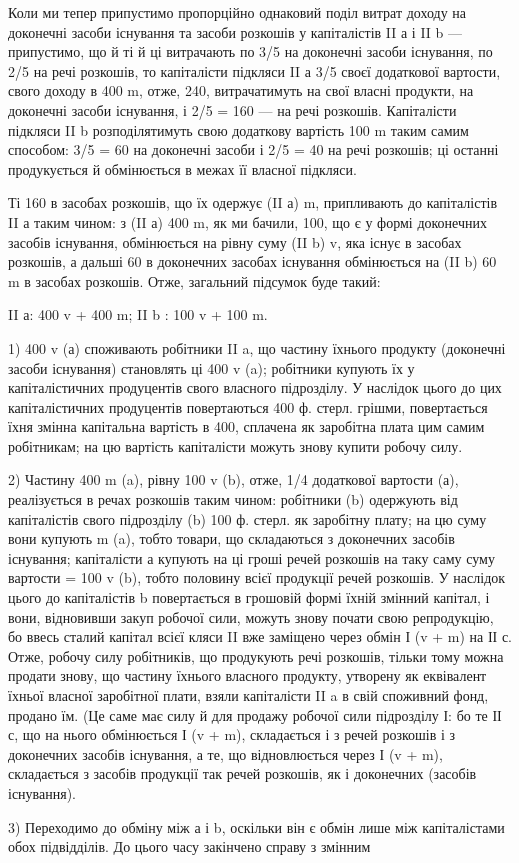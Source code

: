 Коли ми тепер припустимо пропорційно однаковий поділ витрат
доходу на доконечні засоби існування та засоби розкошів у капіталістів
II а і II b — припустимо, що й ті й ці витрачають по 3/5 на доконечні
засоби існування, по 2/5 на речі розкошів, то капіталісти підкляси II а
3/5 своєї додаткової вартости, свого доходу в 400 m, отже, 240, витрачатимуть
на свої власні продукти, на доконечні засоби існування, і
2/5 = 160 — на речі розкошів. Капіталісти підкляси II b розподілятимуть
свою додаткову вартість 100 m таким самим способом: 3/5 = 60 на доконечні
засоби і 2/5 = 40 на речі розкошів; ці останні продукується й
обмінюється в межах її власної підкляси.

Ті 160 в засобах розкошів, що їх одержує (II а) m, припливають до
капіталістів II а таким чином: з (II а) 400 m, як ми бачили, 100, що є у
формі доконечних засобів існування, обмінюється на рівну суму (II b) v,
яка існує в засобах розкошів, а дальші 60 в доконечних засобах існування
обмінюється на (II b) 60 m в засобах розкошів. Отже, загальний
підсумок буде такий:

II а: 400 v + 400 m; II b : 100 v + 100 m.

1) 400 v (а) споживають робітники II a, що частину їхнього продукту
(доконечні засоби існування) становлять ці 400 v (a); робітники купують
їх у капіталістичних продуцентів свого власного підрозділу. У наслідок
цього до цих капіталістичних продуцентів повертаються 400 ф. стерл.
грішми, повертається їхня змінна капітальна вартість в 400, сплачена як
заробітна плата цим самим робітникам; на цю вартість капіталісти можуть
знову купити робочу силу.

2) Частину 400 m (a), рівну 100 v (b), отже, 1/4 додаткової вартости (а),
реалізується в речах розкошів таким чином: робітники (b) одержують від
капіталістів свого підрозділу (b) 100 ф. стерл. як заробітну плату; на
цю суму вони купують m (a), тобто товари, що складаються з доконечних
засобів існування; капіталісти а купують на ці гроші речей
розкошів на таку саму суму вартости = 100 v (b), тобто половину всієї
продукції речей розкошів. У наслідок цього до капіталістів b повертається
в грошовій формі їхній змінний капітал, і вони, відновивши закуп
робочої сили, можуть знову почати свою репродукцію, бо ввесь сталий
капітал всієї кляси II вже заміщено через обмін І (v + m) на ІІ с. Отже,
робочу силу робітників, що продукують речі розкошів, тільки тому
можна продати знову, що частину їхнього власного продукту, утворену
як еквівалент їхньої власної заробітної плати, взяли капіталісти II a в
свій споживний фонд, продано їм. (Це саме має силу й для продажу робочої
сили підрозділу І: бо те ІІ с, що на нього обмінюється І (v + m), складається
і з речей розкошів і з доконечних засобів існування, а те, що
відновлюється через І (v + m), складається з засобів продукції так речей
розкошів, як і доконечних (засобів існування).

3) Переходимо до обміну між а і b, оскільки він є обмін лише між
капіталістами обох підвідділів. До цього часу закінчено справу з змінним
\parbreak{}  %
